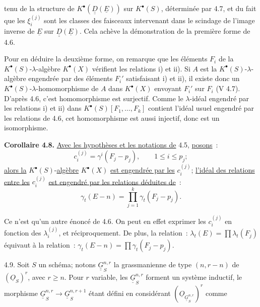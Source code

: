 
tenu de la structure de \(K^{\bullet}(\underline{\underline{D}}(\underline{E}))\) sur \(K^{\bullet}(S)\), déterminée par 4.7, et du fait que les \(\xi_i^{(j)}\) sont les classes des faisceaux intervenant dans le scindage de l'image inverse de \(\underline{E}\) sur \(\underline{\underline{D}}(\underline{E})\). Cela achève la démonstration de la première forme de 4.6.

Pour en déduire la deuxième forme, on remarque que les éléments \(F_i\) de la \(K^{\bullet}(S)\)-\(\lambda\)-algèbre \(K^{\bullet}(X)\) vérifient les relations i) et ii). Si \(A\) est la \(K^{\bullet}(S)\)-\(\lambda\)-algèbre engendrée par des éléments \(F_i'\) satisfaisant i) et ii), il existe donc un \(K^{\bullet}(S)\)-\(\lambda\)-homomorphisme de \(A\) dans \(K^{\bullet}(X)\) envoyant \(F_i'\) sur \(F_i\) (V 4.7). D'après 4.6, c'est homomorphisme est surjectif. Comme le \(\lambda\)-idéal engendré par les relations i) et ii) dans \(K^{\bullet}(S)[F_1,\ldots,F_k]\) contient l'idéal usuel engendré par les relations de 4.6, cet homomorphisme est aussi injectif, donc est un isomorphisme.

\textbf{Corollaire 4.8.} \uline{Avec les hypothèses et les notations de} 4.5, \uline{posons}~:
\[
  c_i^{(j)}=\gamma^i(F_j-p_j),
  \qquad 1\le i\le p_j;
\]
\uline{alors la} \(K^{\bullet}(S)\)-\uline{algèbre} \(K^{\bullet}(X)\) \uline{est engendrée par les} \(c_i^{(j)}\); \uline{l'idéal des relations entre les} \(c_i^{(j)}\) \uline{est engendré par les relations déduites de}~:
\[
  \gamma_t(E-n)=\prod_{j=1}^{k}\gamma_t(F_j-p_j).
\]

Ce n'est qu'un autre énoncé de 4.6. On peut en effet exprimer les \(c_i^{(j)}\) en fonction des \(\lambda_i^{(j)}\), et réciproquement. De plus, la relation~: \(\lambda_t(E)=\prod\lambda_t(F_j)\) équivaut à la relation~: \(\gamma_t(E-n)=\prod\gamma_t(F_j-p_j)\).

4.9.
Soit \(S\) un schéma; notons \(\underline{\underline{G}}_S^{n,r}\) la grassmanienne de type \((n,r-n)\) de \((\underline{O}_S)^r\), avec \(r\ge n\). Pour \(r\) variable, les \(\underline{\underline{G}}_S^{n,r}\) forment un système inductif, le morphisme \(\underline{\underline{G}}_S^{n,r}\longrightarrow \underline{\underline{G}}_S^{n,r+1}\) étant défini en considérant \((\underline{O}_{\underline{\underline{G}}_S^{n,r}})^r\) comme
